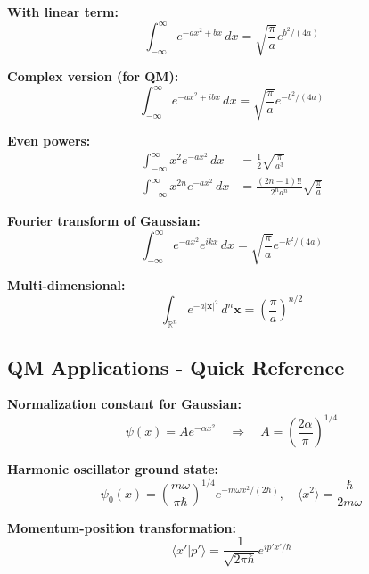 \documentclass[11pt,a4paper]{article}
\begin{document}
\textbf{With linear term:}
\begin{equation}
\boxed{\int_{-\infty}^{\infty} e^{-ax^2 + bx}\, dx = \sqrt{\frac{\pi}{a}}e^{b^2/(4a)}}
\tag{G.2}
\end{equation}

\textbf{Complex version (for QM):}
\begin{equation}
\boxed{\int_{-\infty}^{\infty} e^{-ax^2 + ibx}\, dx = \sqrt{\frac{\pi}{a}}e^{-b^2/(4a)}}
\tag{G.3}
\end{equation}

\textbf{Even powers:}
\begin{align}
\int_{-\infty}^{\infty} x^2 e^{-ax^2}\, dx &= \frac{1}{2}\sqrt{\frac{\pi}{a^3}} \tag{G.4a} \\
\int_{-\infty}^{\infty} x^{2n}e^{-ax^2}\, dx &= \frac{(2n-1)!!}{2^n a^n}\sqrt{\frac{\pi}{a}} \tag{G.4b}
\end{align}

\textbf{Fourier transform of Gaussian:}
\begin{equation}
\boxed{\int_{-\infty}^{\infty} e^{-ax^2}e^{ikx}\, dx = \sqrt{\frac{\pi}{a}}e^{-k^2/(4a)}}
\tag{G.5}
\end{equation}

\textbf{Multi-dimensional:}
\begin{equation}
\int_{\mathbb{R}^n} e^{-a|\mathbf{x}|^2}\, d^n\mathbf{x} = \left(\frac{\pi}{a}\right)^{n/2}
\tag{G.6}
\end{equation}

\subsection{QM Applications - Quick Reference}

\textbf{Normalization constant for Gaussian:}
\begin{equation}
\psi(x) = Ae^{-\alpha x^2} \quad \Rightarrow \quad A = \left(\frac{2\alpha}{\pi}\right)^{1/4}
\tag{A.1}
\end{equation}

\textbf{Harmonic oscillator ground state:}
\begin{equation}
\psi_0(x) = \left(\frac{m\omega}{\pi\hbar}\right)^{1/4}e^{-m\omega x^2/(2\hbar)}, \quad \langle x^2\rangle = \frac{\hbar}{2m\omega}
\tag{A.2}
\end{equation}

\textbf{Momentum-position transformation:}
\begin{equation}
\langle x'|p'\rangle = \frac{1}{\sqrt{2\pi\hbar}}e^{ip'x'/\hbar}
\tag{A.3}
\end{equation}
\end{document}
